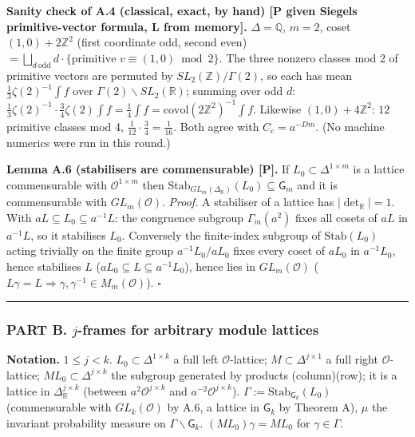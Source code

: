 \textbf{Sanity check of A.4 (classical, exact, by hand) {[}P given Siegel\textquotesingle s primitive-vector formula, L from memory{]}.} \(\Delta=\mathbb Q\), \(m=2\), coset \((1,0)+2\mathbb Z^2\) (first coordinate odd, second even) \(=\bigsqcup_{d\ \mathrm{odd}}d\cdot\{\text{primitive }v\equiv(1,0)\bmod2\}\). The three nonzero classes mod 2 of primitive vectors are permuted by \(SL_2(\mathbb Z)/\Gamma(2)\), so each has mean \(\frac13\zeta(2)^{-1}\int f\) over \(\Gamma(2)\backslash SL_2(\mathbb R)\); summing over odd \(d\): \(\frac13\zeta(2)^{-1}\cdot\frac34\zeta(2)\int f=\frac14\int f=\mathrm{covol}(2\mathbb Z^2)^{-1}\int f\). Likewise \((1,0)+4\mathbb Z^2\): \(12\) primitive classes mod 4, \(\frac1{12}\cdot\frac34=\frac1{16}\). Both agree with \(C_c=a^{-Dm}\). (No machine numerics were run in this round.)

\textbf{Lemma A.6 (stabilisers are commensurable) {[}P{]}.} If \(L_0\subset\Delta^{1\times m}\) is a lattice commensurable with \(\mathcal O^{1\times m}\) then \(\mathrm{Stab}_{GL_m(\Delta_{\mathbb R})}(L_0)\subseteq\mathsf G_m\) and it is commensurable with \(GL_m(\mathcal O)\).
\emph{Proof.} A stabiliser of a lattice has \(|\det_{\mathbb R}|=1\). With \(aL\subseteq L_0\subseteq a^{-1}L\): the congruence subgroup \(\Gamma_m(a^2)\) fixes all cosets of \(aL\) in \(a^{-1}L\), so it stabilises \(L_0\). Conversely the finite-index subgroup of \(\mathrm{Stab}(L_0)\) acting trivially on the finite group \(a^{-1}L_0/aL_0\) fixes every coset of \(aL_0\) in \(a^{-1}L_0\), hence stabilises \(L\) (\(aL_0\subseteq L\subseteq a^{-1}L_0\)), hence lies in \(GL_m(\mathcal O)\) (\(L\gamma=L\Rightarrow\gamma,\gamma^{-1}\in M_m(\mathcal O)\)). \(\square\)

\begin{center}\rule{0.5\linewidth}{0.5pt}\end{center}

\hypertarget{part-b.-j-frames-for-arbitrary-module-lattices}{%
\subsubsection*{\texorpdfstring{PART B. \(j\)-frames for arbitrary module lattices}{PART B. j-frames for arbitrary module lattices}}\label{part-b.-j-frames-for-arbitrary-module-lattices}}

\textbf{Notation.} \(1\le j<k\). \(L_0\subset\Delta^{1\times k}\) a full left \(\mathcal O\)-lattice; \(M\subset\Delta^{j\times1}\) a full right \(\mathcal O\)-lattice; \(ML_0\subset\Delta^{j\times k}\) the subgroup generated by products (column)(row); it is a lattice in \(\Delta_{\mathbb R}^{j\times k}\) (between \(a^2\mathcal O^{j\times k}\) and \(a^{-2}\mathcal O^{j\times k}\)). \(\Gamma:=\mathrm{Stab}_{\mathsf G_k}(L_0)\) (commensurable with \(GL_k(\mathcal O)\) by A.6, a lattice in \(\mathsf G_k\) by Theorem A), \(\mu\) the invariant probability measure on \(\Gamma\backslash\mathsf G_k\). \((ML_0)\gamma=ML_0\) for \(\gamma\in\Gamma\).

